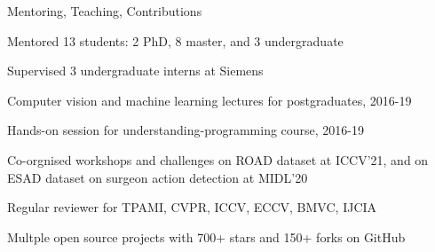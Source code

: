 \documentclass{resume} %
\begin{document}
\begin{paracol}{2}


\begin{rSection}{Mentoring, Teaching, Contributions}{} 
\begin{sSubsection}{Mentored 13 students: 2 PhD, 8 master, and 3 undergraduate} \end{sSubsection} %
\begin{sSubsection}{Supervised 3 undergraduate interns at Siemens}\end{sSubsection}
\begin{sSubsection}{Computer vision and machine learning lectures for postgraduates, 2016-19}\end{sSubsection}
\begin{sSubsection}{Hands-on session for understanding-programming course, 2016-19}\end{sSubsection}
\begin{sSubsection}{Co-orgnised workshops and challenges on ROAD dataset at ICCV'21, and on ESAD dataset on surgeon action detection at MIDL'20}\end{sSubsection}
\begin{sSubsection}{Regular reviewer for TPAMI, CVPR, ICCV, ECCV, BMVC, IJCIA}\end{sSubsection}
\begin{sSubsection}{Multple open source projects with 700+ stars and 150+ forks on GitHub}\end{sSubsection}
\end{rSection}


\end{paracol}
\end{document}

